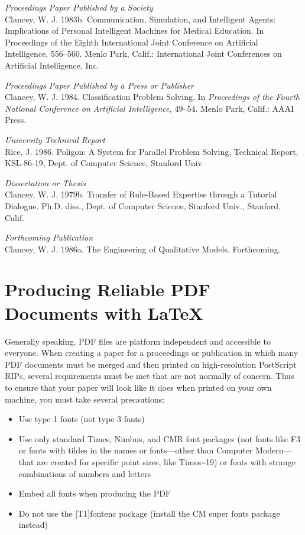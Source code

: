 \documentclass[letterpaper]{article}
\begin{document}
\smallskip \noindent \textit{Proceedings Paper Published by a Society}\\
Clancey, W. J. 1983b. Communication, Simulation, and Intelligent Agents: Implications of Personal Intelligent Machines for Medical Education. In Proceedings of the Eighth International Joint Conference on Artificial Intelligence, 556--560. Menlo Park, Calif.: International Joint Conferences on Artificial Intelligence, Inc.

\smallskip \noindent \textit{Proceedings Paper Published by a Press or Publisher}\\
Clancey, W. J. 1984. Classification Problem Solving. In \textit{Proceedings of the Fourth National Conference on Artificial Intelligence,} 49--54. Menlo Park, Calif.: AAAI Press. 

\smallskip \noindent \textit{University Technical Report}\\
Rice, J. 1986. Poligon: A System for Parallel Problem Solving, Technical Report, KSL-86-19, Dept. of Computer Science, Stanford Univ. 

\smallskip \noindent \textit{Dissertation or Thesis}\\
Clancey, W. J. 1979b. Transfer of Rule-Based Expertise through a Tutorial Dialogue. Ph.D. diss., Dept. of Computer Science, Stanford Univ., Stanford, Calif.

\smallskip \noindent \textit{Forthcoming Publication}\\
Clancey, W. J. 1986a. The Engineering of Qualitative Models. Forthcoming.



\section{Producing Reliable PDF\\Documents with \LaTeX{}}
Generally speaking, PDF files are platform independent and accessible to everyone. When creating a paper for a proceedings or publication in which many PDF documents must be merged and then printed on high-resolution PostScript RIPs, several requirements must be met that are not normally of concern. Thus to ensure that your paper will look like it does when printed on your own machine, you must take several precautions:
\begin{itemize}
\item Use type 1 fonts (not type 3 fonts)
\item Use only standard Times, Nimbus, and CMR font packages (not fonts like F3 or fonts with tildes in the names or fonts---other than Computer Modern---that are created for specific point sizes, like Times\~{}19) or fonts with strange combinations of numbers and letters
\item Embed all fonts when producing the PDF
\item Do not use the [T1]{fontenc} package (install the CM super fonts package instead)
\end{itemize}
\end{document}
